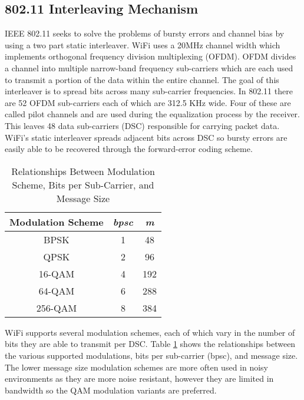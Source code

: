 \documentclass[sigconf]{acmart}
\begin{document}
\subsection{802.11 Interleaving Mechanism}

IEEE 802.11 seeks to solve the problems of bursty errors and channel bias by using a two part static interleaver\cite{vo2016interleaving}. WiFi uses a 20MHz channel width which implements orthogonal frequency division multiplexing (OFDM). OFDM divides a channel into multiple narrow-band frequency sub-carriers which are each used to transmit a portion of the data within the entire channel. The goal of this interleaver is to spread bits across many sub-carrier frequencies. In 802.11 there are 52 OFDM sub-carriers each of which are 312.5 KHz wide\cite{kapp2002802}. Four of these are called pilot channels and are used during the equalization process by the receiver. This leaves 48 data sub-carriers (DSC) responsible for carrying packet data. WiFi's static interleaver spreads adjacent bits across DSC so bursty errors are easily able to be recovered through the forward-error coding scheme. 

\begin{table}[h] 
\begin{tabular}{ccc}
\textbf{Modulation Scheme} & \textit{bpsc} & \textit{m} \\ \hline
BPSK                       & 1             & 48         \\
QPSK                       & 2             & 96         \\
16-QAM                     & 4             & 192        \\
64-QAM                     & 6             & 288        \\
256-QAM                    & 8             & 384       
\end{tabular}
\caption{Relationships Between Modulation Scheme, Bits per Sub-Carrier, and Message Size\cite{vo2016interleaving}}
\label{tab:802Info}
\end{table}


WiFi supports several modulation schemes, each of which vary in the number of bits they are able to transmit per DSC. Table \ref{tab:802Info} shows the relationships between the various supported modulations, bits per sub-carrier (bpsc), and message size. The lower message size modulation schemes are more often used in noisy environments as they are more noise resistant, however they are limited in bandwidth so the QAM modulation variants are preferred\cite{kapp2002802}.
\end{document}
